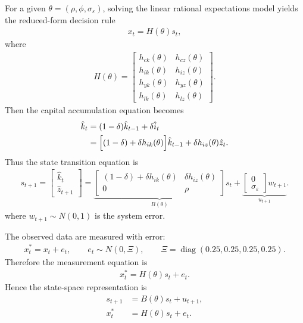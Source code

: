 \documentclass[12pt]{article}
\begin{document}
\begin{enumerate}[label=\arabic*.]
For a given $\theta = (\rho,\phi,\sigma_\varepsilon)$, solving the linear rational expectations model yields the reduced-form decision rule
\begin{align*}
    x_t = H(\theta)s_t,
\end{align*}
where
\begin{align*}
    H(\theta) =
    \begin{bmatrix}
        h_{c k}(\theta) & h_{c z}(\theta) \\
        h_{i k}(\theta) & h_{i z}(\theta) \\
        h_{y k}(\theta) & h_{y z}(\theta) \\
        h_{l k}(\theta) & h_{l z}(\theta)
    \end{bmatrix}.
\end{align*}
Then the capital accumulation equation becomes
\begin{align}
    \hat{k}_t
    &= (1-\delta)\hat{k}_{t-1} + \delta \hat{i}_t \\
    &= \Bigl[(1-\delta) + \delta h_{i k}(\theta)\Bigr]\hat{k}_{t-1}
    + \delta h_{i z}(\theta)\hat{z}_t.
\end{align}
Thus the state transition equation is
\begin{align}
    s_{t+1}
    =
    \begin{bmatrix}
        \hat{k}_t \\
        \hat{z}_{t+1}
    \end{bmatrix}
    =
    \underbrace{
    \begin{bmatrix}
        (1-\delta) + \delta h_{i k}(\theta) & \delta h_{i z}(\theta) \\
        0 & \rho
    \end{bmatrix}}_{B(\theta)}
    s_t
    +
    \underbrace{\begin{bmatrix}
        0 \\
        \sigma_\varepsilon
    \end{bmatrix} w_{t+1}}_{u_{t+1}}.
\end{align}
where $w_{t+1} \sim N(0,1)$ is the system error.

The observed data are measured with error:
\begin{align*}
    x_t^* = x_t + e_t,
    \qquad
    e_t \sim N(0,\Xi),
    \qquad
    \Xi = \operatorname{diag}(0.25, 0.25, 0.25, 0.25).
\end{align*}
Therefore the measurement equation is
\begin{align}
    x_t^*
    = H(\theta)s_t + e_t.
\end{align}
Hence the state-space representation is
\begin{align}
    s_{t+1} &= B(\theta)s_t + u_{t+1}, \\
    x_t^* &= H(\theta)s_t + e_t.
\end{align}


\end{enumerate}
\end{document}
